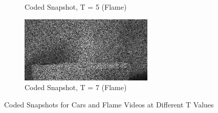 \documentclass{article}
\begin{document}
\begin{enumerate}
\begin{figure}[h!]
\begin{subfigure}{0.3\textwidth}
        \caption{Coded Snapshot, T = 5 (Flame)}
    \end{subfigure}
    \begin{subfigure}{0.3\textwidth}
        \centering
        \includegraphics[width=\linewidth]{../images/flame/coded snapshot, T = 7.png}
        \caption{Coded Snapshot, T = 7 (Flame)}
    \end{subfigure}
    \caption{Coded Snapshots for Cars and Flame Videos at Different T Values}
\end{figure}

\newpage


\end{enumerate}
\end{document}
